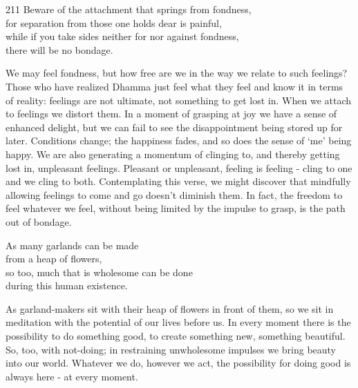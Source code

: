 
\begin{dhpVerse}{211}
\label{dhp-211}
Beware of the attachment that springs from fondness,\\
for separation from those one holds dear is painful,\\
while if you take sides neither for nor against fondness,\\
there will be no bondage.
\end{dhpVerse}

\begin{dhpRefl}
We may feel fondness, but how free are we in the way we relate to such feelings? Those who have realized Dhamma just feel what they feel and know it in terms of reality: feelings are not ultimate, not something to get lost in. When we attach to feelings we distort them. In a moment of grasping at joy we have a sense of enhanced delight, but we can fail to see the disappointment being stored up for later. Conditions change; the happiness fades, and so does the sense of `me' being happy. We are also generating a momentum of clinging to, and thereby getting lost in, unpleasant feelings. Pleasant or unpleasant, feeling is feeling - cling to one and we cling to both. Contemplating this verse, we might discover that mindfully allowing feelings to come and go doesn't diminish them. In fact, the freedom to feel whatever we feel, without being limited by the impulse to grasp, is the path out of bondage.
\end{dhpRefl}


\begin{dhpVerse}{53}
\label{dhp-53}
As many garlands can be made\\
from a heap of flowers,\\
so too, much that is wholesome can be done\\
during this human existence.
\end{dhpVerse}

\begin{dhpRefl}
As garland-makers sit with their heap of flowers in front of them, so we sit in meditation with the potential of our lives before us. In every moment there is the possibility to do something good, to create something new, something beautiful. So, too, with not-doing; in restraining unwholesome impulses we bring beauty into our world. Whatever we do, however we act, the possibility for doing good is always here - at every moment.
\end{dhpRefl}

